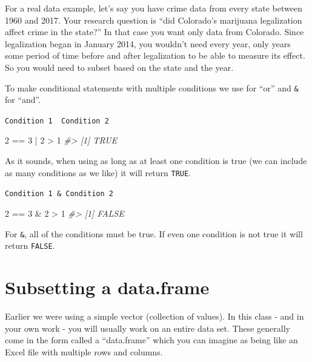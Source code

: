 \documentclass[
]{krantz}
\makeatletter
\newenvironment{Shaded}{\begin{snugshade}}{\end{snugshade}}
\newcommand{\CommentTok}[1]{\textcolor[rgb]{0.37,0.37,0.37}{\textit{#1}}}
\newcommand{\DecValTok}[1]{\textcolor[rgb]{0.06,0.06,0.06}{#1}}
\newcommand{\SpecialCharTok}[1]{\textcolor[rgb]{0,0,0}{#1}}
\newenvironment{kframe}{%
\medskip{}
\setlength{\fboxsep}{.8em}
 \def\at@end@of@kframe{}%
 \ifinner\ifhmode%
  \def\at@end@of@kframe{\end{minipage}}%
  \begin{minipage}{\columnwidth}%
 \fi\fi%
 \def\FrameCommand##1{\hskip\@totalleftmargin \hskip-\fboxsep
 \colorbox{shadecolor}{##1}\hskip-\fboxsep
     \hskip-\linewidth \hskip-\@totalleftmargin \hskip\columnwidth}%
 \MakeFramed {\advance\hsize-\width
   \@totalleftmargin\z@ \linewidth\hsize
   \@setminipage}}%
 {\par\unskip\endMakeFramed%
 \at@end@of@kframe}
\renewenvironment{Shaded}{\begin{kframe}}{\end{kframe}}
\makeatother
\begin{document}
For a real data example, let's say you have crime data from every state between 1960 and 2017. Your research question is ``did Colorado's marijuana legalization affect crime in the state?'' In that case you want only data from Colorado. Since legalization began in January 2014, you wouldn't need every year, only years some period of time before and after legalization to be able to measure its effect. So you would need to subset based on the state and the year.

To make conditional statements with multiple conditions we use \texttt{\textbar{}} for ``or'' and \texttt{\&} for ``and''.

\texttt{Condition\ 1\ \textbar{}\ Condition\ 2}

\begin{Shaded}
\begin{Highlighting}[]
\DecValTok{2} \SpecialCharTok{==} \DecValTok{3} \SpecialCharTok{|} \DecValTok{2} \SpecialCharTok{\textgreater{}} \DecValTok{1}
\CommentTok{\#\textgreater{} [1] TRUE}
\end{Highlighting}
\end{Shaded}

As it sounds, when using \texttt{\textbar{}} as long as at least one condition is true (we can include as many conditions as we like) it will return \texttt{TRUE}.

\texttt{Condition\ 1\ \&\ Condition\ 2}

\begin{Shaded}
\begin{Highlighting}[]
\DecValTok{2} \SpecialCharTok{==} \DecValTok{3} \SpecialCharTok{\&} \DecValTok{2} \SpecialCharTok{\textgreater{}} \DecValTok{1}
\CommentTok{\#\textgreater{} [1] FALSE}
\end{Highlighting}
\end{Shaded}

For \texttt{\&}, all of the conditions must be true. If even one condition is not true it will return \texttt{FALSE}.

\hypertarget{subsetting-a-data.frame}{%
\section{Subsetting a data.frame}\label{subsetting-a-data.frame}}

Earlier we were using a simple vector (collection of values). In this class - and in your own work - you will usually work on an entire data set. These generally come in the form called a ``data.frame'' which you can imagine as being like an Excel file with multiple rows and columns.
\end{document}
